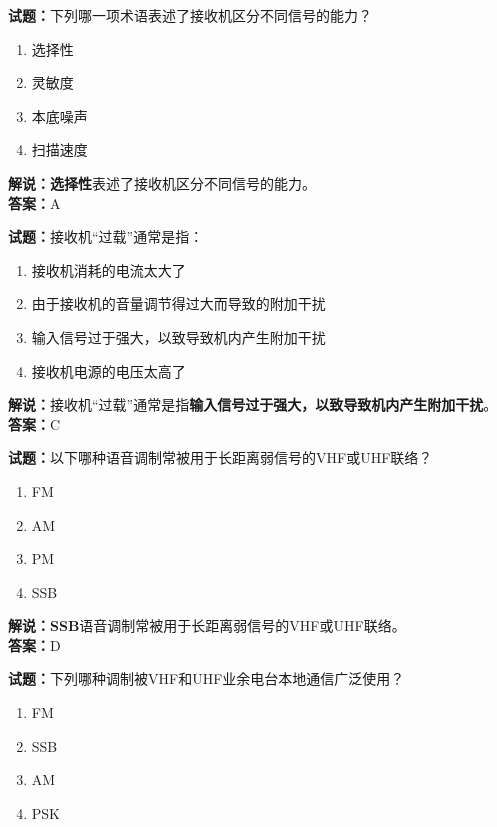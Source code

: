 \documentclass{ctexbook}
\begin{document}
\bigskip

\noindent\textbf{试题：}下列哪一项术语表述了接收机区分不同信号的能力？

\begin{enumerate}[leftmargin=3em]
  \item 选择性
  \item 灵敏度
  \item 本底噪声
  \item 扫描速度
\end{enumerate}

\noindent\textbf{解说：}\textbf{选择性}表述了接收机区分不同信号的能力。\\\noindent\textbf{答案：}A%

\bigskip

\noindent\textbf{试题：}接收机“过载”通常是指：

\begin{enumerate}[leftmargin=3em]
  \item 接收机消耗的电流太大了
  \item 由于接收机的音量调节得过大而导致的附加干扰
  \item 输入信号过于强大，以致导致机内产生附加干扰
  \item 接收机电源的电压太高了
\end{enumerate}

\noindent\textbf{解说：}接收机“过载”通常是指\textbf{输入信号过于强大，以致导致机内产生附加干扰}。\\\noindent\textbf{答案：}C%

\bigskip

\noindent\textbf{试题：}以下哪种语音调制常被用于长距离弱信号的VHF或UHF联络？

\begin{enumerate}[leftmargin=3em]
  \item FM
  \item AM
  \item PM
  \item SSB
\end{enumerate}

\noindent\textbf{解说：}\textbf{SSB}语音调制常被用于长距离弱信号的VHF或UHF联络。\\\noindent\textbf{答案：}D

\bigskip

\noindent\textbf{试题：}下列哪种调制被VHF和UHF业余电台本地通信广泛使用？

\begin{enumerate}[leftmargin=3em]
  \item FM
  \item SSB
  \item AM
  \item PSK
\end{enumerate}
\end{document}
